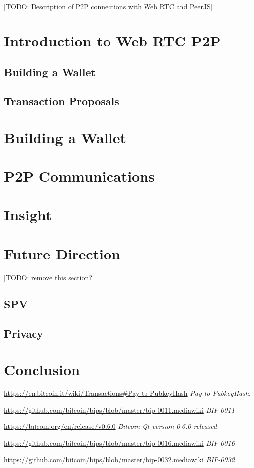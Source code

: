 \documentclass{article}
\begin{document}
[TODO: Description of P2P connections with Web RTC and PeerJS]

\section{Introduction to Web RTC P2P}

\subsection{Building a Wallet}

\subsection{Transaction Proposals}

\section{Building a Wallet}

\section{P2P Communications}

\section{Insight}

\section{Future Direction}

[TODO: remove this section?]

\subsection{SPV}

\subsection{Privacy}

\section{Conclusion}


\begin{thebibliography}{9}

  \url{https://en.bitcoin.it/wiki/Transactions#Pay-to-PubkeyHash}
  \emph{Pay-to-PubkeyHash}.

  \url{https://github.com/bitcoin/bips/blob/master/bip-0011.mediawiki}
  \emph{BIP-0011}

  \url{https://bitcoin.org/en/release/v0.6.0}
  \emph{Bitcoin-Qt version 0.6.0 released}

  \url{https://github.com/bitcoin/bips/blob/master/bip-0016.mediawiki}
  \emph{BIP-0016}

  \url{https://github.com/bitcoin/bips/blob/master/bip-0032.mediawiki}
  \emph{BIP-0032}

\end{thebibliography}
\end{document}
